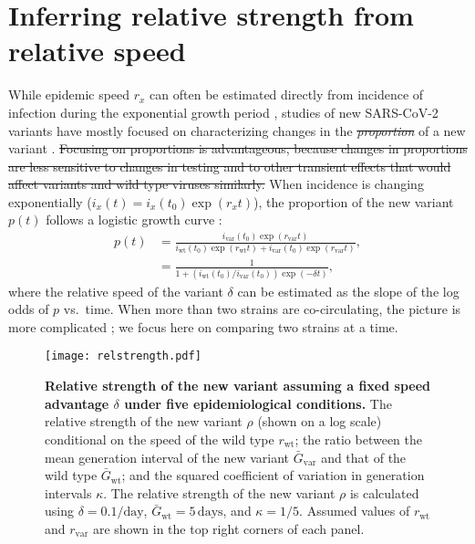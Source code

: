 \documentclass[12pt]{article}
\newcommand{\vvvar}{\mathrm{var}}
\newcommand{\wwwt}{\mathrm{wt}}
\newcommand{\rx}[1]{\ensuremath{{r}_{#1}}\xspace}
\newcommand{\rw}{\rx{\wwwt}}
\newcommand{\rv}{\rx{\vvvar}}
\newcommand{\days}{\ensuremath{\, \textrm{days}}}
\newcommand{\pday}{\ensuremath{/\textrm{day}}}
\newcommand{\ix}[1]{\ensuremath{{i}_{#1}}\xspace}
\newcommand{\iw}{\ix{\wwwt}}
\newcommand{\iv}{\ix{\vvvar}}
\newcommand{\Gx}[1]{\ensuremath{{\bar G}_{#1}}\xspace}
\newcommand{\Gw}{\Gx{\wwwt}}
\newcommand{\Gv}{\Gx{\vvvar}}
\providecommand{\DIFaddtex}[1]{{\protect\color{blue}\uwave{#1}}} %
\providecommand{\DIFdeltex}[1]{{\protect\color{red}\sout{#1}}}                      %
\providecommand{\DIFaddbegin}{} %
\providecommand{\DIFaddend}{} %
\providecommand{\DIFdelbegin}{} %
\providecommand{\DIFdelend}{} %
\providecommand{\DIFadd}[1]{\texorpdfstring{\DIFaddtex{#1}}{#1}} %
\providecommand{\DIFdel}[1]{\texorpdfstring{\DIFdeltex{#1}}{}} %
\newcommand{\DIFscaledelfig}{0.5}
\newlength{\DIFdelgraphicswidth} %
\newlength{\DIFdelgraphicsheight} %
\newcommand{\DIFaddincludegraphics}[2][]{{\color{blue}\fbox{\DIFOincludegraphics[#1]{#2}}}} %
\newcommand{\DIFdelincludegraphics}[2][]{%
\sbox{\DIFdelgraphicsbox}{\DIFOincludegraphics[#1]{#2}}%
\settoboxwidth{\DIFdelgraphicswidth}{\DIFdelgraphicsbox} %
\settoboxtotalheight{\DIFdelgraphicsheight}{\DIFdelgraphicsbox} %
\scalebox{\DIFscaledelfig}{%
\parbox[b]{\DIFdelgraphicswidth}{\usebox{\DIFdelgraphicsbox}\\[-\baselineskip] \rule{\DIFdelgraphicswidth}{0em}}\llap{\resizebox{\DIFdelgraphicswidth}{\DIFdelgraphicsheight}{%
\setlength{\unitlength}{\DIFdelgraphicswidth}%
\begin{picture}(1,1)%
\thicklines\linethickness{2pt} %
{\color[rgb]{1,0,0}\put(0,0){\framebox(1,1){}}}%
{\color[rgb]{1,0,0}\put(0,0){\line( 1,1){1}}}%
{\color[rgb]{1,0,0}\put(0,1){\line(1,-1){1}}}%
\end{picture}%
}\hspace*{3pt}}} %
} %
\DeclareRobustCommand{\DIFaddbegin}{\DIFOaddbegin \let\includegraphics\DIFaddincludegraphics} %
\DeclareRobustCommand{\DIFaddend}{\DIFOaddend \let\includegraphics\DIFOincludegraphics} %
\DeclareRobustCommand{\DIFdelbegin}{\DIFOdelbegin \let\includegraphics\DIFdelincludegraphics} %
\DeclareRobustCommand{\DIFdelend}{\DIFOaddend \let\includegraphics\DIFOincludegraphics} %
\begin{document}
\section{Inferring relative strength from relative speed}

While epidemic speed $r_x$ can often be estimated directly from incidence of infection during the exponential growth period \citep{mills2004transmissibility,nishiura2009transmission,ma2014estimating},
studies of new SARS-CoV-2 variants have mostly focused on characterizing changes in the \DIFdelbegin \emph{\DIFdel{proportion}} %
\DIFdelend \DIFaddbegin \DIFadd{proportion }\DIFaddend of a new variant \citep{switzerland2021variant, davies2021estimated, di2021impact, graham2021changes, leung2021early, volz2021transmission,zhao2021}.
\DIFdelbegin \DIFdel{Focusing on proportions is advantageous, because changes in proportions are less sensitive to changes in testing and to other transient effects that would affect variants and wild type viruses similarly.
}\DIFdelend When incidence is changing exponentially ($i_x(t) = i_x(t_0) \exp(r_x t)$), the proportion of the new variant $p(t)$ follows a logistic growth curve \citep{switzerland2021variant,davies2021estimated}:
\begin{align}
p(t) &= \frac{\iv(t_0) \exp(\rv t)}{\iw(t_0) \exp(\rw t) + \iv(t_0) \exp(\rv t)},
\\ &= \frac{1}{1 + \left(\iw(t_0)/\iv(t_0)\right) \exp(-\delta t)},
\end{align}
where the relative speed of the variant $\delta$ can be estimated as the slope of the log odds of $p$  vs.~time.
When more than two strains are co-circulating, the picture is more complicated \citep{campbell2021increased}; we focus here on comparing two strains at a time.

\begin{figure}[!t]
\texttt{[image: relstrength.pdf]}
\caption{
\textbf{Relative strength of the new variant assuming a fixed speed advantage $\delta$ under five epidemiological conditions.}
The relative strength of the new variant $\rho$ (shown on a log scale) conditional on the speed of the wild type $\rw$; the ratio between the mean generation interval of the new variant $\Gv$ and that of the wild type $\Gw$; and the squared coefficient of variation in generation intervals $\kappa$.
The relative strength of the new variant $\rho$ is calculated using $\delta=0.1\pday$, $\Gw = 5\days$, and $\kappa = 1/5$.
Assumed values of $\rw$ and $\rv$ are shown in the top right corners of each panel.
}
\label{fig:relstrength}
\end{figure}
\end{document}

